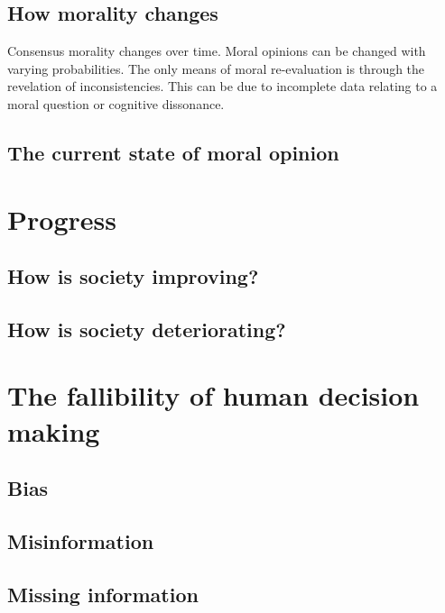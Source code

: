 \subsection{How morality changes}
Consensus morality changes over time.
Moral opinions can be changed with varying probabilities.
The only means of moral re-evaluation is through the revelation of inconsistencies.
This can be due to incomplete data relating to a moral question or cognitive dissonance.

\subsection{The current state of moral opinion}

\section{Progress}

\subsection{How is society improving?}

\subsection{How is society deteriorating?}

\section{The fallibility of human decision making}
\subsection{Bias}
\subsection{Misinformation}
\subsection{Missing information}

